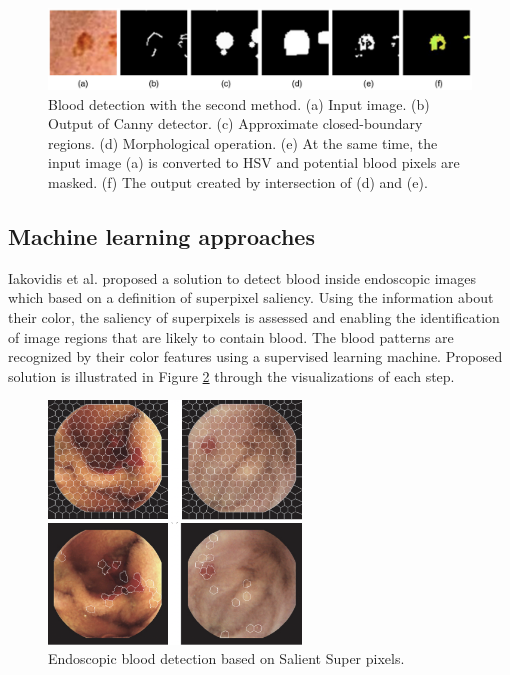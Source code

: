 \begin{figure}[thb]
    \centering
    \includegraphics[width=\textwidth]{endoscopy_resources/blood_color.png}
    \caption{Blood detection with the second method.  (a) Input image. (b) Output of Canny detector. (c) Approximate closed-boundary regions. (d) Morphological operation. (e) At the same time, the input image (a) is converted to HSV and potential blood pixels are masked. (f) The output created by intersection of (d) and (e).\cite{blood_detection_color}}
    \label{fig:blood_detect_color}
\end{figure}


\subsection{Machine learning approaches}
Iakovidis et al. \cite{bloodsalientsuperpixels} proposed a solution to detect blood inside endoscopic images which based on a definition of superpixel saliency. Using the information about their color, the
saliency of superpixels is assessed and
enabling the identification of image regions that are likely to contain blood. The blood patterns are recognized by their color features using a supervised learning machine. Proposed solution is illustrated in Figure \ref{fig:super_pixel} through the visualizations of each step.
\begin{figure}[thb]
    \centering
    \includegraphics[width=0.6\textwidth]{endoscopy_resources/super_pixels_salient.png}
    \caption{Endoscopic blood detection based on Salient Super pixels.\cite{bloodsalientsuperpixels}}
    \label{fig:super_pixel}
\end{figure}
